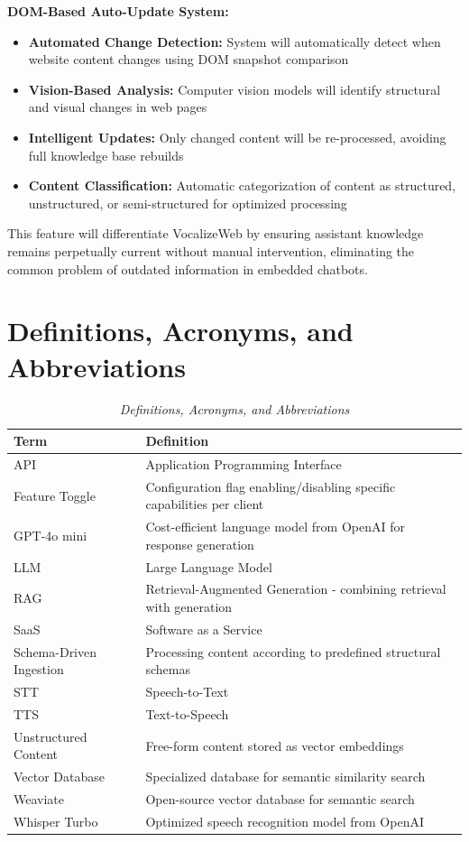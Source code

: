 \textbf{DOM-Based Auto-Update System:}
\begin{itemize}[leftmargin=*]
    \item \textbf{Automated Change Detection:} System will automatically detect when website content changes using DOM snapshot comparison
    \item \textbf{Vision-Based Analysis:} Computer vision models will identify structural and visual changes in web pages
    \item \textbf{Intelligent Updates:} Only changed content will be re-processed, avoiding full knowledge base rebuilds
    \item \textbf{Content Classification:} Automatic categorization of content as structured, unstructured, or semi-structured for optimized processing
\end{itemize}

This feature will differentiate VocalizeWeb by ensuring assistant knowledge remains perpetually current without manual intervention, eliminating the common problem of outdated information in embedded chatbots.


\section{Definitions, Acronyms, and Abbreviations}

\begin{table}[H]
\centering
\caption{\textit{Definitions, Acronyms, and Abbreviations}}
\begin{tabularx}{\textwidth}{|l|X|}
\hline
\textbf{Term} & \textbf{Definition} \\
\hline
API & Application Programming Interface \\
\hline

Feature Toggle & Configuration flag enabling/disabling specific capabilities per client \\
\hline
GPT-4o mini & Cost-efficient language model from OpenAI for response generation \\
\hline
LLM & Large Language Model \\
\hline
RAG & Retrieval-Augmented Generation - combining retrieval with generation \\
\hline
SaaS & Software as a Service \\
\hline
Schema-Driven Ingestion & Processing content according to predefined structural schemas \\
\hline

STT & Speech-to-Text \\
\hline

TTS & Text-to-Speech \\
\hline
Unstructured Content & Free-form content stored as vector embeddings \\
\hline
Vector Database & Specialized database for semantic similarity search \\
\hline

Weaviate & Open-source vector database for semantic search \\
\hline
Whisper Turbo & Optimized speech recognition model from OpenAI \\
\hline
\end{tabularx}
\end{table}

